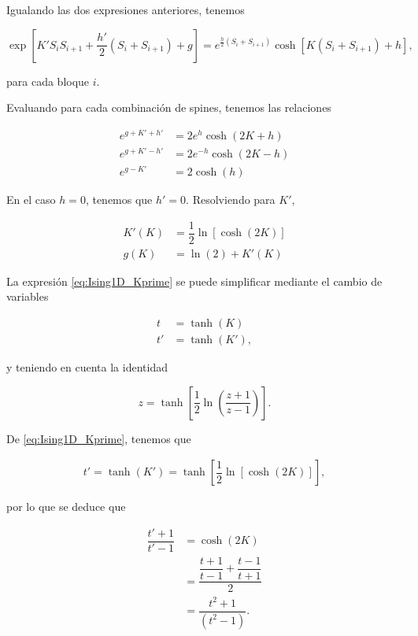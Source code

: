 \documentclass[10pt]{article}
\begin{document}
Igualando las dos expresiones anteriores, tenemos

\begin{equation}
 \exp\left[  K' S_i S_{i+1} + \dfrac{h'}{2} (S_i + S_{i+1}) + g \right] = e^{\frac{h}{2} (S_i + S_{i+1}) }  \cosh\left[ K (S_i + S_{i+1}) + h \right],
\end{equation}

para cada bloque $i$.

Evaluando para cada combinaci\'on de spines, tenemos las relaciones

\begin{align}
e^{g+K'+h'} &= 2e^{h}\cosh(2K+h) \\
e^{g+K'-h'} &= 2e^{-h}\cosh(2K-h) \\
e^{g-K'} &= 2\cosh(h) 
\end{align}

En el caso $h=0$, tenemos que $h'=0$. Resolviendo para $K'$,

\begin{align}
K'(K) &= \dfrac{1}{2} \ln \left[ \cosh(2K) \right] \label{eq:Ising1D_Kprime}\\
g(K) &= \ln(2) + K'(K)
\end{align}

La expresi\'on \ref{eq:Ising1D_Kprime} se puede simplificar mediante el cambio de variables

\begin{align}
t  &= \tanh(K)\\
t' &= \tanh(K'),
\end{align}

y teniendo en cuenta la identidad 

\begin{equation}
z = \tanh\left[\dfrac{1}{2}\ln\left( \dfrac{z+1}{z-1} \right)\right].
\end{equation}

De \ref{eq:Ising1D_Kprime}, tenemos que

\begin{align}
 t' = \tanh(K') = \tanh \left[ \dfrac{1}{2} \ln \left[ \cosh(2K) \right]  \right],
\end{align}

por lo que se deduce que 

\begin{align}
 \dfrac{t'+1}{t'-1}  &= \cosh(2K) \nonumber \\
 &= \dfrac{\dfrac{t+1}{t-1} + \dfrac{t-1}{t+1}}{2} \nonumber \\
 &= \dfrac{t^2+1}{(t^2-1)}.
\end{align}
\end{document}

